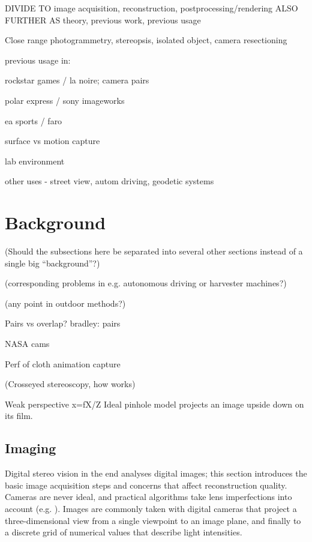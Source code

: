 DIVIDE TO image acquisition, reconstruction, postprocessing/rendering
ALSO FURTHER AS theory, previous work, previous usage

Close range photogrammetry, stereopsis, isolated object, camera resectioning


previous usage in:

	rockstar games / la noire; camera pairs

	polar express / sony imageworks

	ea sports / faro


surface vs motion capture

lab environment

other uses - street view, autom driving, geodetic systems

\section{Background}

(Should the subsections here be separated into several other sections instead of a single big ``background''?)

(corresponding problems in e.g. autonomous driving or harvester machines?)

(any point in outdoor methods?)

Pairs vs overlap? bradley: pairs

NASA cams

Perf of cloth animation capture

(Crosseyed stereoscopy, how works)

Weak perspective x=fX/Z
Ideal pinhole model projects an image upside down on its film.

\subsection{Imaging} \label{sec:imaging} %

Digital stereo vision in the end analyses digital images; this section introduces the basic image acquisition steps and concerns that affect reconstruction quality. Cameras are never ideal, and practical algorithms take lens imperfections into account (e.g. \cite{opencv}). Images are commonly taken with digital cameras that project a three-dimensional view from a single viewpoint to an image plane, and finally to a discrete grid of numerical values that describe light intensities.


